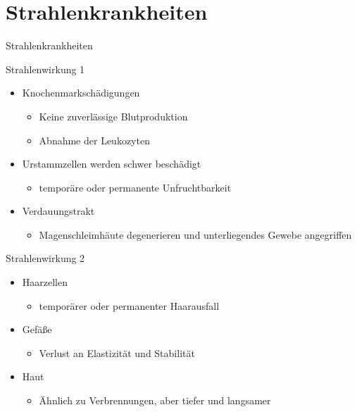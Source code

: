 \section{Strahlenkrankheiten}
\begin{frame}
	\begin{block}{Strahlenkrankheiten}
	\end{block}
\end{frame}
\begin{frame}{Strahlenwirkung 1}
	\begin{itemize}
		\item Knochenmarkschädigungen
		\begin{itemize}
			\item[\Rightarrow] Keine zuverlässige Blutproduktion
			\item[\Rightarrow] Abnahme der Leukozyten
		\end{itemize}
		\item Urstammzellen werden schwer beschädigt
		\begin{itemize}
			\item[\Rightarrow] temporäre oder permanente Unfruchtbarkeit
		\end{itemize}
		\item Verdauungstrakt
		\begin{itemize}
			\item[\Rightarrow] Magenschleimhäute degenerieren und unterliegendes Gewebe angegriffen
		\end{itemize}
	\end{itemize}
\end{frame}
\begin{frame}{Strahlenwirkung 2}
	\begin{itemize}
		\item Haarzellen
		\begin{itemize}
			\item[\Rightarrow] temporärer oder permanenter Haarausfall
		\end{itemize}
		\item Gefäße
		\begin{itemize}
			\item[\Rightarrow] Verlust an Elastizität und Stabilität
		\end{itemize}
		\item Haut
		\begin{itemize}
			\item[\Rightarrow] Ähnlich zu Verbrennungen, aber tiefer und langsamer
		\end{itemize}
	\end{itemize}
\end{frame}
